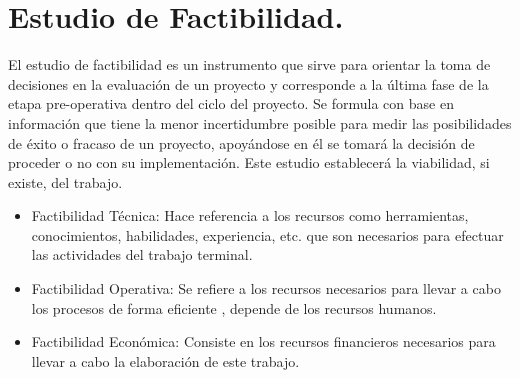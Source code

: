 \documentclass[12pt, a4paper, titlepage]{report}
\begin{document}
    	\section{Estudio de Factibilidad.}
    	El estudio de factibilidad es un instrumento que sirve para orientar la toma de decisiones en la evaluación de un proyecto y corresponde a la última fase de la etapa pre-operativa dentro del ciclo del proyecto. Se formula con base en información que tiene la menor incertidumbre posible para medir las posibilidades de éxito o fracaso de un proyecto, apoyándose en él se tomará la decisión de proceder o no con su implementación. Este estudio establecerá la viabilidad, si existe, del trabajo.
    	\begin{itemize}
    	    \item Factibilidad Técnica: Hace referencia a los recursos como herramientas, conocimientos, habilidades, experiencia, etc. que son necesarios para efectuar las actividades del trabajo terminal.
    	    \item Factibilidad Operativa: Se refiere a los recursos necesarios para llevar a cabo los procesos de forma eficiente , depende de los recursos humanos.
    	    \item Factibilidad Econ\'omica: Consiste en los recursos financieros necesarios para llevar a cabo la elaboraci\'on de este trabajo.
    	\end{itemize}
\end{document}
